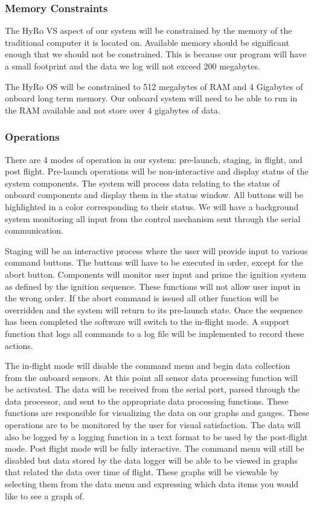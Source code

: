 \documentclass[10pt,draftclsnofoot,onecolumn,retainorgcmds]{IEEEtran}
\begin{document}
\subsubsection{Memory Constraints}
The HyRo VS aspect of our system will be constrained by the memory of the traditional computer it is located on. Available memory should be significant enough that we should not be constrained. This is because our program will have a small footprint and the data we log will not exceed 200 megabytes.\par 
The HyRo OS will be constrained to 512 megabytes of RAM and 4 Gigabytes of onboard long term memory. Our onboard system will need to be able to run in the RAM available and not store over 4 gigabytes of data.


\subsubsection {Operations}
There are 4 modes of operation in our system: pre-launch, staging, in flight, and post flight.  Pre-launch operations will be non-interactive and display status of the system components. The system will process data relating to the status of onboard components and display them in the status window. All buttons will be highlighted in a color corresponding to their status. We will have a background system monitoring all input from the control mechanism sent through the serial communication. \par
Staging will be an interactive process where the user will provide input to various command buttons. The buttons will have to be executed in order, except for the abort button. Components will monitor user input and prime the ignition system as defined by the ignition sequence. These functions will not allow user input in the wrong order. If the abort command is issued all other function will be overridden and the system will return to its pre-launch state. Once the sequence has been completed the software will switch to the in-flight mode. A support function that logs all commands to a log file will be implemented to record these actions.\par
The in-flight mode will disable the command menu and begin data collection from the onboard sensors. At this point all sensor data processing function will be activated. The data will be received from the serial port, parsed through the data processor, and sent to the appropriate data processing functions. These functions are responsible for visualizing the data on our graphs and gauges. These operations are to be monitored by the user for visual satisfaction.  The data will also be logged by a logging function in a text format to be used by the post-flight mode.
Post flight mode will be fully interactive. The command menu will still be disabled but data stored by the data logger will be able to be viewed in graphs that related the data over time of flight. These graphs will be viewable by selecting them from the data menu and expressing which data items you would like to see a graph of. \par
\end{document}
